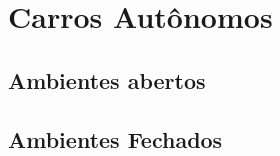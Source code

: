 \chapter{Carros Aut{\^o}nomos}

\lipsum[1-2]

\section{Ambientes abertos}

\lipsum[4-7]

\section{Ambientes Fechados}

\lipsum[8-11]
